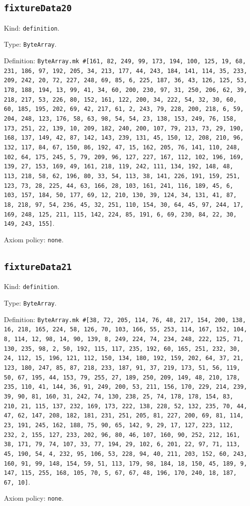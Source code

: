 \documentclass[11pt]{article}
\begin{document}
\subsection*{\texttt{fixtureData20}}
\noindent Kind: \texttt{definition}.\par
\noindent Type: \texttt{ByteArray}.\par
\noindent Definition: \texttt{ByteArray.mk \#[161, 82, 249, 99, 173, 194, 100, 125, 19, 68, 231, 186, 97, 192, 205, 34, 213, 177, 44, 243, 184, 141, 114, 35, 233, 209, 242, 20, 72, 227, 248, 69, 85, 6, 225, 187, 36, 43, 126, 125, 53, 178, 188, 194, 13, 99, 41, 34, 60, 200, 230, 97, 31, 250, 206, 62, 39, 218, 217, 53, 226, 80, 152, 161, 122, 200, 34, 222, 54, 32, 30, 60, 60, 185, 195, 202, 69, 42, 217, 61, 2, 243, 79, 228, 200, 218, 6, 59, 204, 248, 123, 176, 58, 63, 98, 54, 54, 23, 138, 153, 249, 76, 158, 173, 251, 22, 139, 10, 209, 182, 240, 200, 107, 79, 213, 73, 29, 190, 168, 137, 149, 42, 87, 142, 143, 239, 131, 45, 150, 12, 208, 210, 96, 132, 117, 84, 67, 150, 86, 192, 47, 15, 162, 205, 76, 141, 110, 248, 102, 64, 175, 245, 5, 79, 209, 96, 127, 227, 167, 112, 102, 196, 169, 139, 27, 153, 169, 49, 161, 218, 119, 242, 111, 134, 192, 148, 48, 113, 218, 58, 62, 196, 80, 33, 54, 113, 38, 141, 226, 191, 159, 251, 123, 73, 28, 225, 44, 63, 166, 28, 103, 161, 241, 116, 189, 45, 6, 103, 157, 184, 50, 177, 69, 12, 210, 130, 39, 124, 34, 131, 41, 87, 18, 218, 97, 54, 236, 45, 32, 251, 110, 154, 30, 64, 45, 97, 244, 17, 169, 248, 125, 211, 115, 142, 224, 85, 191, 6, 69, 230, 84, 22, 30, 149, 243, 155]}.\par
\noindent Axiom policy: \texttt{none}.\par
\subsection*{\texttt{fixtureData21}}
\noindent Kind: \texttt{definition}.\par
\noindent Type: \texttt{ByteArray}.\par
\noindent Definition: \texttt{ByteArray.mk \#[38, 72, 205, 114, 76, 48, 217, 154, 200, 138, 16, 218, 165, 224, 58, 126, 70, 103, 166, 55, 253, 114, 167, 152, 104, 8, 114, 12, 98, 14, 90, 139, 8, 249, 224, 74, 234, 248, 222, 125, 71, 130, 235, 98, 2, 50, 192, 115, 117, 235, 192, 60, 165, 251, 232, 30, 24, 112, 15, 196, 121, 112, 150, 134, 180, 192, 159, 202, 64, 37, 21, 123, 180, 247, 85, 87, 218, 233, 187, 91, 37, 219, 173, 51, 56, 119, 50, 67, 195, 44, 153, 79, 255, 27, 189, 250, 209, 149, 48, 210, 178, 235, 110, 41, 144, 36, 91, 249, 200, 53, 211, 156, 170, 229, 214, 239, 39, 90, 81, 160, 31, 242, 74, 130, 238, 25, 74, 178, 178, 154, 83, 210, 21, 115, 137, 232, 169, 173, 222, 138, 228, 52, 132, 235, 70, 44, 47, 62, 147, 208, 182, 181, 231, 251, 205, 81, 227, 200, 69, 81, 114, 23, 191, 245, 162, 188, 75, 90, 65, 142, 9, 29, 17, 127, 223, 112, 232, 2, 155, 127, 233, 202, 96, 80, 46, 107, 160, 90, 252, 212, 161, 38, 171, 79, 74, 107, 33, 77, 194, 29, 102, 6, 201, 22, 97, 71, 113, 45, 190, 54, 4, 232, 95, 106, 53, 228, 94, 40, 211, 203, 152, 60, 243, 160, 91, 99, 148, 154, 59, 51, 113, 179, 98, 184, 18, 150, 45, 189, 9, 147, 115, 255, 168, 105, 70, 5, 67, 67, 48, 196, 170, 240, 18, 187, 67, 10]}.\par
\noindent Axiom policy: \texttt{none}.\par
\end{document}

